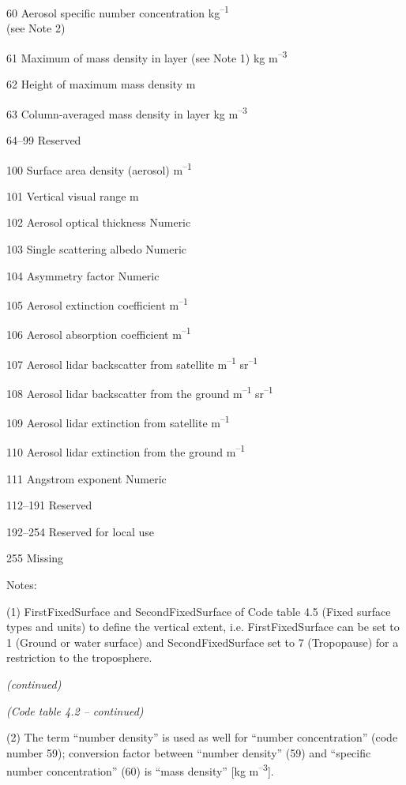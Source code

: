 60 Aerosol specific number concentration kg\textsuperscript{--1}\\
(see Note 2)

61 Maximum of mass density in layer (see Note 1) kg m\textsuperscript{--3}

62 Height of maximum mass density m

63 Column-averaged mass density in layer kg m\textsuperscript{--3}

64--99 Reserved

100 Surface area density (aerosol) m\textsuperscript{--1}

101 Vertical visual range m

102 Aerosol optical thickness Numeric

103 Single scattering albedo Numeric

104 Asymmetry factor Numeric

105 Aerosol extinction coefficient m\textsuperscript{--1}

106 Aerosol absorption coefficient m\textsuperscript{--1}

107 Aerosol lidar backscatter from satellite m\textsuperscript{--1} sr\textsuperscript{--1}

108 Aerosol lidar backscatter from the ground m\textsuperscript{--1} sr\textsuperscript{--1}

109 Aerosol lidar extinction from satellite m\textsuperscript{--1}

110 Aerosol lidar extinction from the ground m\textsuperscript{--1}

111 Angstrom exponent Numeric

112--191 Reserved

192--254 Reserved for local use

255 Missing

Notes:

(1) FirstFixedSurface and SecondFixedSurface of Code table 4.5 (Fixed surface types and units) to define the vertical extent, i.e. FirstFixedSurface can be set to 1 (Ground or water surface) and SecondFixedSurface set to 7 (Tropopause) for a restriction to the troposphere.

\emph{(continued)}\textbf{\\
}

\emph{(Code table 4.2 -- continued)}

(2) The term ``number density'' is used as well for ``number concentration'' (code number 59); conversion factor between ``number density'' (59) and ``specific number concentration'' (60) is ``mass density'' {[}kg m\textsuperscript{--3}{]}.

